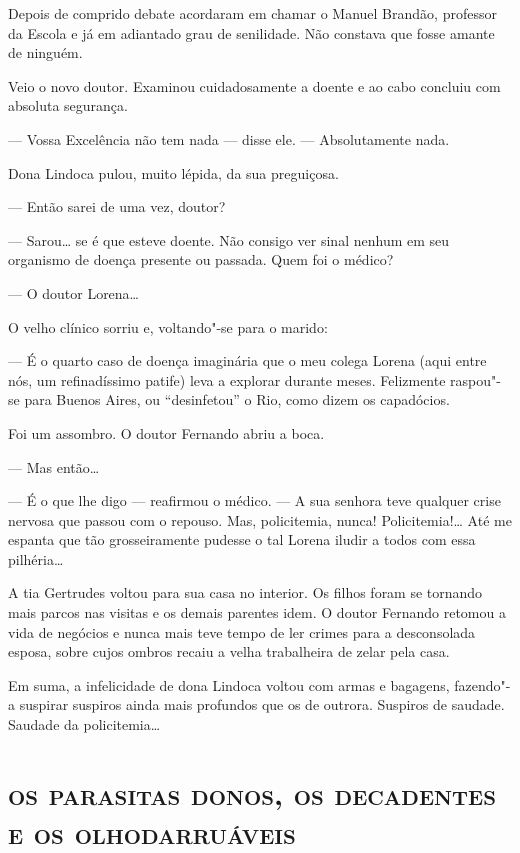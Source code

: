 Depois de comprido debate acordaram em chamar o Manuel Brandão,
professor da Escola e já em adiantado grau de senilidade. Não constava
que fosse amante de ninguém.

Veio o novo doutor. Examinou cuidadosamente a doente e ao cabo concluiu
com absoluta segurança.

--- Vossa Excelência não tem nada --- disse ele. --- Absolutamente nada.

Dona Lindoca pulou, muito lépida, da sua preguiçosa.

--- Então sarei de uma vez, doutor?

--- Sarou\ldots{} se é que esteve doente. Não consigo ver sinal nenhum em seu
organismo de doença presente ou passada. Quem foi o médico?

--- O doutor Lorena\ldots{}

O velho clínico sorriu e, voltando"-se para o marido:

--- É o quarto caso de doença imaginária que o meu colega Lorena (aqui
entre nós, um refinadíssimo patife) leva a explorar durante meses.
Felizmente raspou"-se para Buenos Aires, ou ``desinfetou'' o Rio, como
dizem os capadócios.

Foi um assombro. O doutor Fernando abriu a boca.

--- Mas então\ldots{}

--- É o que lhe digo --- reafirmou o médico. --- A sua senhora teve
qualquer crise nervosa que passou com o repouso. Mas, policitemia,
nunca! Policitemia!\ldots{} Até me espanta que tão grosseiramente pudesse o
tal Lorena iludir a todos com essa pilhéria\ldots{}

A tia Gertrudes voltou para sua casa no interior. Os filhos foram se
tornando mais parcos nas visitas e os demais parentes idem. O doutor
Fernando retomou a vida de negócios e nunca mais teve tempo de ler
crimes para a desconsolada esposa, sobre cujos ombros recaiu a velha
trabalheira de zelar pela casa.

Em suma, a infelicidade de dona Lindoca voltou com armas e bagagens,
fazendo"-a suspirar suspiros ainda mais profundos que os de outrora.
Suspiros de saudade. Saudade da policitemia\ldots{}

\part[os parasitas donos, os decadentes e os olhodarruáveis]{\textsc{os parasitas donos, os decadentes\\ e os olhodarruáveis}}

